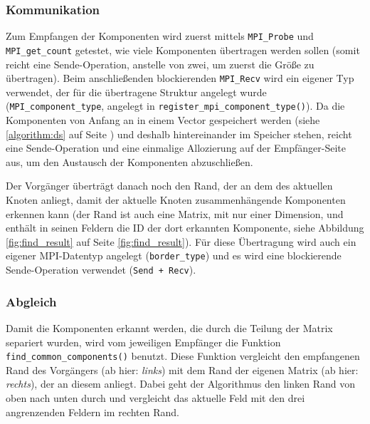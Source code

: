 \subsubsection{Kommunikation}

Zum Empfangen der Komponenten wird zuerst mittels \verb+MPI_Probe+ und \verb+MPI_get_count+ getestet, wie viele Komponenten übertragen werden sollen (somit reicht eine Sende-Operation, anstelle von zwei, um zuerst die Größe zu übertragen). Beim anschließenden blockierenden \verb+MPI_Recv+ wird ein eigener Typ verwendet, der für die übertragene Struktur angelegt wurde (\verb+MPI_component_type+, angelegt in \verb+register_mpi_component_type()+). Da die Komponenten von Anfang an in einem Vector gespeichert werden (siehe \ref{algorithm:ds} auf Seite \pageref{algorithm:ds}) und deshalb hintereinander im Speicher stehen, reicht eine Sende-Operation und eine einmalige Allozierung auf der Empfänger-Seite aus, um den Austausch der Komponenten abzuschließen.

Der Vorgänger überträgt danach noch den Rand, der an dem des aktuellen Knoten anliegt, damit der aktuelle Knoten zusammenhängende Komponenten erkennen kann (der Rand ist auch eine Matrix, mit nur einer Dimension, und enthält in seinen Feldern die ID der dort erkannten Komponente, siehe Abbildung \ref{fig:find_result} auf Seite \ref{fig:find_result}). Für diese Übertragung wird auch ein eigener MPI-Datentyp angelegt (\verb+border_type+) und es wird eine blockierende Sende-Operation verwendet (\verb$Send + Recv$).

\subsubsection{Abgleich}

Damit die Komponenten erkannt werden, die durch die Teilung der Matrix separiert wurden, wird vom jeweiligen Empfänger die Funktion \verb+find_common_components()+ benutzt. Diese Funktion vergleicht den empfangenen Rand des Vorgängers (ab hier: \textit{links}) mit dem Rand der eigenen Matrix (ab hier: \textit{rechts}), der an diesem anliegt. Dabei geht der Algorithmus den linken Rand von oben nach unten durch und vergleicht das aktuelle Feld mit den drei angrenzenden Feldern im rechten Rand.

